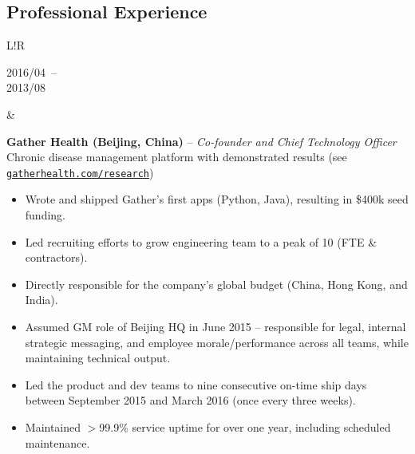 \documentclass[10pt]{article}
\newcommand\VRule{\color{lightgray}\vrule width 0.5pt}
\def\spaceBeforeExperienceBullets{\vspace{-10pt}}
\begin{document}
\begin{CJK}{UTF8}{gbsn}
\section*{Professional Experience}
\begin{tabular}{L!{\VRule}R}
    \parbox[t]{1.0\linewidth}{
        {\scriptsize 2016/04}~--\\
        {\scriptsize 2013/08}
    }&
    \parbox[t]{1.0\linewidth}{
        {\bf Gather Health (Beijing, China)} -- \textit{Co-founder and Chief Technology Officer}\\
        Chronic disease management platform with demonstrated results (see \texttt{\small\href{https://gatherhealth.com/research}{gatherhealth.com/research}})\\
        \spaceBeforeExperienceBullets
        \begin{itemize}[leftmargin=16pt]
            \item Wrote and shipped Gather's first apps (Python, Java), resulting in \$400k seed funding.
            \item Led recruiting efforts to grow engineering team to a peak of 10 (FTE \& contractors).
            \item Directly responsible for the company's global budget (China, Hong Kong, and India).
            \item Assumed GM role of Beijing HQ in June 2015 -- responsible for legal, internal strategic messaging, and employee morale/performance across all teams, while maintaining technical output.
            \item Led the product and dev teams to nine consecutive on-time ship days between September 2015 and March 2016 (once every three weeks).
            \item Maintained $>$99.9\% service uptime for over one year, including scheduled maintenance.
        \end{itemize}
    }\\


\end{tabular}
\end{CJK}
\end{document}

